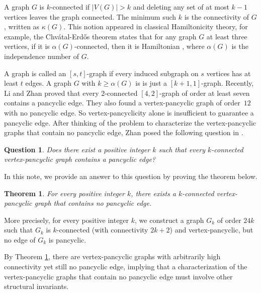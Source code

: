 \documentclass[12pt]{article}
\newtheorem{theorem}{Theorem}
\newtheorem{question}{Question}
\begin{document}
A graph $G$ is $k$-connected if $|V(G)|>k$ and deleting any set of at most $k-1$ vertices leaves the graph connected. The minimum  such $k$ is the connectivity of $G$, written as $\kappa(G)$. This notion appeared in classical Hamiltonicity theory, for example, the Chv\'{a}tal-Erd\H{o}s theorem states that for any graph $G$ at least three vertices, if it is $\alpha(G)$-connected, then it  is Hamiltonian \cite{ChvatalErdos1972}, where $\alpha (G)$ is the independence number of $G$. 



A graph is called  an $[s,t]$-graph if every induced subgraph on $s$ vertices has at least $t$ edges. A graph $G$ with $k\ge \alpha(G)$ is is just  a $[k+1,1]$-graph. Recently, Li and Zhan \cite{LiZhan2026} proved that every $2$-connected $[4,2]$-graph of order at least seven contains a pancyclic edge. 
They also found a vertex-pancyclic graph of order~$12$ with no pancyclic edge. 
So vertex-pancyclicity alone is insufficient to guarantee a pancyclic edge. 
After thinking of the problem to characterize the vertex-pancyclic graphs that contain no pancyclic edge, Zhan posed the following question in \cite{LiZhan2026}.

\begin{question} \label{ques:zhan}
Does there exist a positive integer $k$ such that every $k$-connected vertex-pancyclic graph contains a pancyclic edge?
\end{question}


In this note, we provide an answer to this question by proving the theorem below.

\begin{theorem}\label{thm:main}
For every positive integer $k$, there exists a $k$-connected vertex-pancyclic graph that contains no pancyclic edge.
\end{theorem}

More precisely, for every positive integer $k$,  we construct a  graph $G_k$ of order $24k$ such that $G_k$ is $k$-connected (with connectivity $2k+2$) and vertex-pancyclic, but no edge of $G_k$ is pancyclic.

By Theorem \ref{thm:main}, there are vertex-pancyclic graphs with arbitrarily high connectivity yet still no pancyclic edge, implying that  a characterization of the vertex-pancyclic graphs that contain no pancyclic edge must involve other structural invariants.
\end{document}
